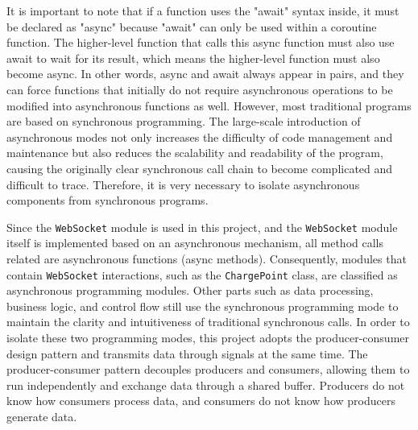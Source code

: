 \documentclass[
	english,
	ruledheaders=section,%
	class=report,%
	thesis={type=Report},%
	accentcolor=9c,%
	custommargins=true,%
	marginpar=false,%
	parskip=half-,%
	fontsize=11pt,%
	logofile={img/tuda_logo.pdf}, %
]{tudapub}
\begin{document}


It is important to note that if a function uses the "await" syntax inside, it must be declared as "async" because "await" can only be used within a coroutine function. The higher-level function that calls this async function must also use await to wait for its result, which means the higher-level function must also become async. In other words, async and await always appear in pairs, and they can force functions that initially do not require asynchronous operations to be modified into asynchronous functions as well. However, most traditional programs are based on synchronous programming. The large-scale introduction of asynchronous modes not only increases the difficulty of code management and maintenance but also reduces the scalability and readability of the program, causing the originally clear synchronous call chain to become complicated and difficult to trace. Therefore, it is very necessary to isolate asynchronous components from synchronous programs.


Since the \texttt{WebSocket} module is used in this project, and the \texttt{WebSocket} module itself is implemented based on an asynchronous mechanism, all method calls related are asynchronous functions (async methods). Consequently, modules that contain \texttt{WebSocket} interactions, such as the \texttt{ChargePoint} class, are classified as asynchronous programming modules. Other parts such as data processing, business logic, and control flow still use the synchronous programming mode to maintain the clarity and intuitiveness of traditional synchronous calls. In order to isolate these two programming modes, this project adopts the producer-consumer design pattern and transmits data through signals at the same time. The producer-consumer pattern decouples producers and consumers, allowing them to run independently and exchange data through a shared buffer. Producers do not know how consumers process data, and consumers do not know how producers generate data.
\end{document}
